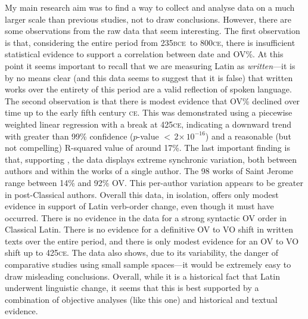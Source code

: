 \documentclass[11pt,a4paper]{scrartcl} %
\newcommand{\bce}{\textsc{bce}\ }
\begin{document}
My main research aim was to find a way to collect and analyse data on a much larger scale than previous studies, not to draw conclusions. However, there are some observations from the raw data that seem interesting. The first observation is that, considering the entire period from 235\bce to 800\textsc{ce}, there is insufficient statistical evidence to support a correlation between date and OV\%. At this point it seems important to recall that we are measuring Latin as \textit{written}---it is by no means clear (and this data seems to suggest that it is false) that written works over the entirety of this period are a valid reflection of spoken language. The second observation is that there is modest evidence that OV\% declined over time up to the early fifth century \textsc{ce}. This was demonstrated using a piecewise weighted linear regression with a break at 425\textsc{ce}, indicating a downward trend with greater than 99\% confidence ($p$-value $<$\,2$\times\,\text{10}^{-\text{16}}$) and a reasonable (but not compelling) R-squared value of around 17\%. The last important finding is that, supporting \cite{pinkster}, the data displays extreme synchronic variation, both between authors and within the works of a single author. The 98 works of Saint Jerome range between 14\% and 92\% OV. This per-author variation appears to be greater in post-Classical authors. Overall this data, in isolation, offers only modest evidence in support of Latin verb-order change, even though it must have occurred. There is no evidence in the data for a strong syntactic OV order in Classical Latin. There is no evidence for a definitive OV to VO shift in written texts over the entire period, and there is only modest evidence for an OV to VO shift up to 425\textsc{ce}. The data also shows, due to its variability, the danger of comparative studies using small sample spaces---it would be extremely easy to draw misleading conclusions. Overall, while it is a historical fact that Latin underwent linguistic change, it seems that this is best supported by a combination of objective analyses (like this one) and historical and textual evidence.

\newpage


\end{document}
